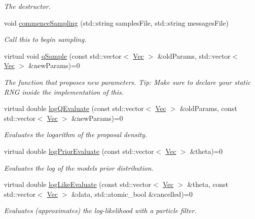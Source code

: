 \begin{DoxyCompactItemize}
\begin{DoxyCompactList}\small\item\em The destructor. \end{DoxyCompactList}\item 
void \hyperlink{classPmmh_ac035560cb209fb5cade23e431b5e1fd3}{commence\+Sampling} (std\+::string samples\+File, std\+::string messages\+File)
\begin{DoxyCompactList}\small\item\em Call this to begin sampling. \end{DoxyCompactList}\item 
virtual void \hyperlink{classPmmh_a7ada4decd5df894376c74e3ddba5daa1}{q\+Sample} (const std\+::vector$<$ \hyperlink{pmfs_8h_a4c7df05c6f5e8a0d15ae14bcdbc07152}{Vec} $>$ \&old\+Params, std\+::vector$<$ \hyperlink{pmfs_8h_a4c7df05c6f5e8a0d15ae14bcdbc07152}{Vec} $>$ \&new\+Params)=0
\begin{DoxyCompactList}\small\item\em The function that proposes new parameters. Tip\+: Make sure to declare your static R\+NG inside the implementation of this. \end{DoxyCompactList}\item 
virtual double \hyperlink{classPmmh_af8d3fdbc3f3c998670266a3032a53e80}{log\+Q\+Evaluate} (const std\+::vector$<$ \hyperlink{pmfs_8h_a4c7df05c6f5e8a0d15ae14bcdbc07152}{Vec} $>$ \&old\+Params, const std\+::vector$<$ \hyperlink{pmfs_8h_a4c7df05c6f5e8a0d15ae14bcdbc07152}{Vec} $>$ \&new\+Params)=0
\begin{DoxyCompactList}\small\item\em Evaluates the logarithm of the proposal density. \end{DoxyCompactList}\item 
virtual double \hyperlink{classPmmh_a265ca1c1380d0ebc052be2c5424a0d3b}{log\+Prior\+Evaluate} (const std\+::vector$<$ \hyperlink{pmfs_8h_a4c7df05c6f5e8a0d15ae14bcdbc07152}{Vec} $>$ \&theta)=0
\begin{DoxyCompactList}\small\item\em Evaluates the log of the model\textquotesingle{}s prior distribution. \end{DoxyCompactList}\item 
virtual double \hyperlink{classPmmh_a293931e138576f063aab7e46228f0266}{log\+Like\+Evaluate} (const std\+::vector$<$ \hyperlink{pmfs_8h_a4c7df05c6f5e8a0d15ae14bcdbc07152}{Vec} $>$ \&theta, const std\+::vector$<$ \hyperlink{pmfs_8h_a4c7df05c6f5e8a0d15ae14bcdbc07152}{Vec} $>$ \&data, std\+::atomic\+\_\+bool \&cancelled)=0
\begin{DoxyCompactList}\small\item\em Evaluates (approximates) the log-\/likelihood with a particle filter. \end{DoxyCompactList}\end{DoxyCompactItemize}


